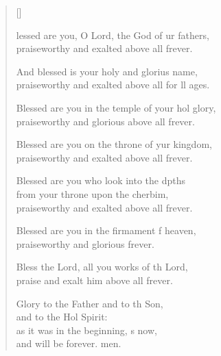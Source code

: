 \settowidth{\versewidth}{Blessed are you in the temple of your holy glory, *}
\begin{verse}[\versewidth]
  \begin{patverse}
lessed are you, O Lord, the God of ur fathers,\Med\\
praiseworthy and exalted above all frever.

And blessed is your holy and glorius name,\Med\\
praiseworthy and exalted above all for ll ages.

Blessed are you in the temple of your hol glory,\Med\\
praiseworthy and glorious above all frever.

Blessed are you on the throne of yur kingdom,\Med\\
praiseworthy and exalted above all frever.

Blessed are you who look into the dpths\Flex\\
from your throne upon the cherbim,\Med\\
praiseworthy and exalted above all frever.

Blessed are you in the firmament f heaven,\Med\\
praiseworthy and glorious frever.

Bless the Lord, all you works of th Lord,\Med\\
praise and exalt him above all frever.

Glory to the Father and to th Son,\Med\\
and to the Hol Spirit:\\
as it was in the beginning, \pointup{\i}s now,\Med\\
and will be forever. men. 
  \end{patverse}
\end{verse}
